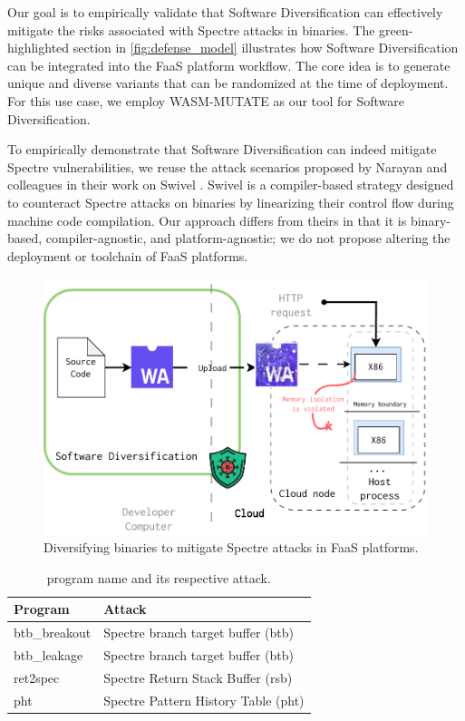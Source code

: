 


Our goal is to empirically validate that Software Diversification can effectively mitigate the risks associated with Spectre attacks in \Wasm binaries. 
The green-highlighted section in \autoref{fig:defense_model} illustrates how Software Diversification can be integrated into the FaaS platform workflow. 
The core idea is to generate unique and diverse \Wasm variants that can be randomized at the time of deployment. 
For this use case, we employ WASM-MUTATE as our tool for Software Diversification.

To empirically demonstrate that Software Diversification can indeed mitigate Spectre vulnerabilities, we reuse the \Wasm attack scenarios proposed by Narayan and colleagues in their work on Swivel \cite{Swivel}. 
Swivel is a compiler-based strategy designed to counteract Spectre attacks on \Wasm binaries by linearizing their control flow during machine code compilation. 
Our approach differs from theirs in that it is binary-based, compiler-agnostic, and platform-agnostic; we do not propose altering the deployment or toolchain of FaaS platforms. 


\begin{figure}[h]
    \centering
    \includegraphics[width=0.75\linewidth]{figures/edge_protected.pdf}
    \caption{Diversifying \Wasm binaries to mitigate Spectre attacks in FaaS platforms.}
    \label{fig:defense_model}
\end{figure}

\begin{table}
    \centering
    \begin{tabular}{l | l  }
        \hline
         Program &  Attack  \\
        \hline \hline
        btb\_breakout & Spectre branch target buffer (btb)  \\
        \hline
         btb\_leakage & Spectre branch target buffer (btb)  \\
        \hline
         ret2spec &  Spectre Return Stack Buffer (rsb)  \\
        \hline
        pht &  Spectre Pattern History Table (pht)  \\

    \end{tabular}
    \caption{\Wasm program name and its respective attack.}
    \label{programs}
\end{table}

